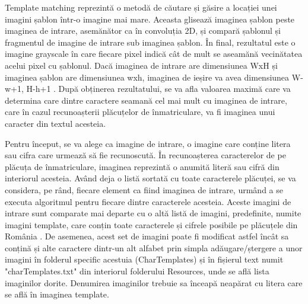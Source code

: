 \documentclass[12pt]{article}
\begin{document}
Template matching reprezint\u{a} o metod\u{a} de c\u{a}utare și g\u{a}sire a locației unei imagini șablon \^{i}ntr-o imagine mai mare. Aceasta gliseaz\u{a} imaginea șablon peste imaginea de intrare, asem\u{a}n\u{a}tor ca \^{i}n convoluția 2D, și compar\u{a} șablonul și fragmentul de imagine de intrare sub imaginea șablon. \^{I}n final, rezultatul este o imagine grayscale \^{i}n care fiecare pixel indic\u{a} c\^{a}t de mult se aseam\u{a}n\u{a} vecin\u{a}tatea acelui pixel cu șablonul. Dac\u{a} imaginea de intrare are dimensiunea WxH și imaginea șablon are dimensiunea wxh, imaginea de ieșire va avea dimensiunea W-w+1, H-h+1 \cite{templatematching}. Dup\u{a} obținerea rezultatului, se va afla valoarea maxim\u{a} care va determina care dintre caractere seaman\u{a} cel mai mult cu imaginea de intrare, care \^{i}n cazul recunoașterii pl\u{a}cuțelor de \^{i}nmatriculare, va fi imaginea unui caracter din textul acesteia.

Pentru \^{i}nceput, se va alege ca imagine de intrare, o imagine care conține litera sau cifra care urmeaz\u{a} s\u{a} fie recunoscut\u{a}.  \^{I}n recunoașterea caracterelor de pe pl\u{a}cuța de \^{i}nmatriculare, imaginea reprezint\u{a} o anumit\u{a} liter\u{a} sau cifr\u{a} din interiorul acesteia. Av\^{a}nd deja o list\u{a} sortat\u{a} cu toate caracterele pl\u{a}cuței, se va considera, pe r\^{a}nd, fiecare element ca fiind imaginea de intrare, urm\^{a}nd a se executa algoritmul pentru fiecare dintre caracterele acesteia. Aceste imagini de intrare sunt comparate mai departe cu o alt\u{a} list\u{a} de imagini, predefinite, numite imagini template, care conțin toate caracterele și cifrele posibile pe pl\u{a}cuțele din Rom\^{a}nia \cite{templatematchingart}. De asemenea, acest set de imagini poate fi modificat astfel \^{i}nc\^{a}t sa conțin\u{a} și alte caractere dintr-un alt alfabet prin simpla ad\u{a}ugare/ștergere a unor imagini \^{i}n folderul specific acestuia (CharTemplates) și \^{i}n fișierul text numit "charTemplates.txt" din interiorul folderului Resources, unde se afl\u{a} lista imaginilor dorite. Denumirea imaginilor trebuie sa \^{i}nceap\u{a} neap\u{a}rat cu litera care se afl\u{a} \^{i}n imaginea template.
\end{document}
